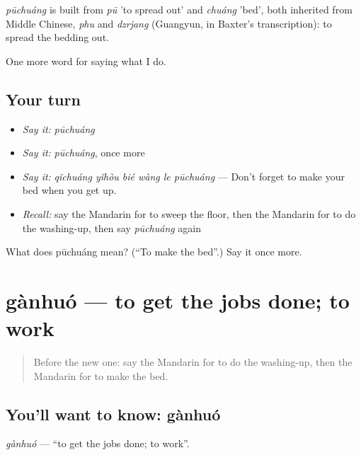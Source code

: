 \begin{cousinweb}
\emph{pūchuáng} is built from \emph{pū} 'to spread out' and \emph{chuáng} 'bed', both inherited from Middle Chinese, \emph{phu} and \emph{dzrjang} (Guangyun, in Baxter's transcription): to spread the bedding out.
\end{cousinweb}

\begin{grammarlens}[title={What you've built}]
One more word for saying what I do.
\end{grammarlens}

\subsection*{Your turn}
\begin{itemize}
\raggedright
  \item \emph{Say it:} \emph{pūchuáng}
  \item \emph{Say it:} \emph{pūchuáng}, once more
  \item \emph{Say it:} \emph{qǐchuáng yǐhòu bié wàng le pūchuáng} — Don't forget to make your bed when you get up.
  \item \emph{Recall:} say the Mandarin for to sweep the floor, then the Mandarin for to do the washing-up, then say \emph{pūchuáng} again
\end{itemize}

\begin{tcolorbox}[breakable,colback=teal!4,colframe=teal!35!black,title={Before you move on}]
What does pūchuáng mean? (\textquotedblleft{}To make the bed\textquotedblright{}.) Say it once more.
\end{tcolorbox}
\section[gànhuó]{gànhuó — to get the jobs done; to work}

\label{lesson:ZH-C160-ganhuo}



\begin{quote}
Before the new one: say the Mandarin for to do the washing-up, then the Mandarin for to make the bed.
\end{quote}

\subsection*{You'll want to know: gànhuó}
\emph{gànhuó} — \textquotedblleft{}to get the jobs done; to work\textquotedblright{}.

